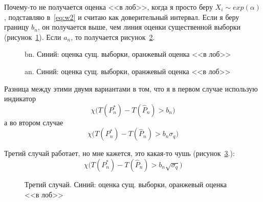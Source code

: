 \documentclass[12pt, specialist, subf, substylefile = spbu.rtx]{disser}
\begin{document}
Почему-то не получается оценка <<в лоб>>, когда я просто беру $X_i \sim exp(\alpha)$, подставляю в~\eqref{eq:w2} и считаю как доверительный интервал. Если я беру границу $b_n$, он получается выше, чем линия оценки существенной выборки (рисунок~\ref{ris:plot_bn}). Если $a_n$, то получается рисунок~\ref{ris:plot_an}.


\begin{figure}[!!h]
\caption{bn. Синий: оценка сущ. выборки, оранжевый оценка <<в лоб>>}
\label{ris:plot_bn}
\end{figure}


\begin{figure}[!!h]
\caption{an. Синий: оценка сущ. выборки, оранжевый оценка <<в лоб>>}
\label{ris:plot_an}
\end{figure}

Разница между этими двумя вариантами в том, что я в первом случае использую индикатор 
$$
\chi \big( T(P^*_n)-T(\hat{P}_n) > b_n \big)
$$
а во втором случае 
$$
\chi \big( T(P^*_n)-T(\hat{P}_n) > b_n \sigma_q \big)
$$

Третий случай работает, но мне кажется, это какая-то чушь (рисунок~\ref{ris:plot_cn}.):
$$
\chi \big( T(P^*_n)-T(\hat{P}_n) > b_n \sqrt{\sigma_q} \big)
$$

\begin{figure}[!h]
\caption{Третий случай. Синий: оценка сущ. выборки, оранжевый оценка <<в лоб>>}
\label{ris:plot_cn}
\end{figure}
\end{document}
